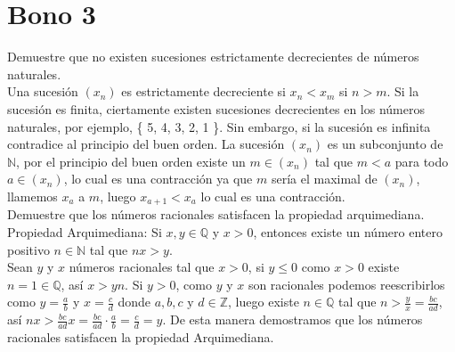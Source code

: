 \documentclass{report}
\begin{document}
    \tableofcontents

    \pagebreak
    \chapter{ Bono 3 }

    \noindent Demuestre que no existen sucesiones estrictamente decrecientes de números naturales.\\

    Una sucesión $(x_n)$ es estrictamente decreciente si $x_n < x_m$ si $n > m$. Si la sucesión es finita, ciertamente existen sucesiones decrecientes en los números naturales, por ejemplo, \{ 5, 4, 3, 2, 1 \}. Sin embargo, si la sucesión es infinita contradice al principio del buen orden. La sucesión $(x_n)$ es un subconjunto de $\mathbb{N}$, por el principio del buen orden existe un $m \in (x_n)$ tal que $m < a$ para todo $a \in (x_n)$, lo cual es una contracción ya que $m$ sería el maximal de $(x_n)$, llamemos $x_a$ a $m$, luego $x_{a+1} < x_a$ lo cual es una contracción.\\

    \noindent Demuestre que los números racionales satisfacen la propiedad arquimediana. Propiedad Arquimediana: Si $x, y \in \mathbb{Q}$ y $x>0$, entonces existe un número entero positivo $n \in \mathbb{N}$ tal que $nx > y$.\\

    \noindent Sean $y$ y $x$ números racionales tal que $x > 0$, si $y \leq 0$ como $x > 0$ existe $n = 1 \in \mathbb{Q}$, así $x > yn$. Si $y > 0$, como $y$ y $x$ son racionales podemos reescribirlos como $y = \frac{a}{b}$ y $x = \frac{c}{d}$ donde $a, b, c \text{ y } d \in \mathbb{Z}$, luego existe $n \in \mathbb{Q}$ tal que $n > \frac{y}{x} = \frac{bc}{ad}$, así $nx > \frac{bc}{ad}x = \frac{bc}{ad} \cdot \frac{a}{b} = \frac{c}{d} = y$. De esta manera demostramos que los números racionales satisfacen la propiedad Arquimediana.
\end{document}
